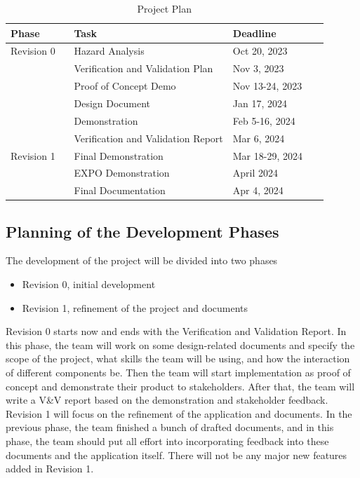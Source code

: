 \documentclass[12pt]{article}
\begin{document}
\begin{table}[H]
    \centering
    \begin{tabular}{|p{0.2\linewidth} | p{0.5\linewidth}| p{0.3\linewidth} |}
    \hline
    \textbf{Phase} & \textbf{Task} & \textbf{Deadline}\\
    \hline
    Revision 0 & Hazard Analysis & Oct 20, 2023 \\
     \cline{2-3} & Verification and Validation Plan & Nov 3, 2023 \\
     \cline{2-3} & Proof of Concept Demo & Nov 13-24, 2023\\
     \cline{2-3} & Design Document & Jan 17, 2024\\
     \cline{2-3} & Demonstration & Feb 5-16, 2024\\
     \cline{2-3} & Verification and Validation Report & Mar 6, 2024\\
     \hline
     Revision 1 & Final Demonstration & Mar 18-29, 2024\\
     \cline{2-3} & EXPO Demonstration & April 2024\\
     \cline{2-3} & Final Documentation & Apr 4, 2024\\
     
     
     
     
     
    \hline
    \end{tabular}
    \caption{Project Plan}
    \label{TblProjectTasks}
\end{table}

\subsection{Planning of the Development Phases}
The development of the project will be divided into two phases
\begin{itemize}
    \item Revision 0, initial development
    \item Revision 1, refinement of the project and documents
\end{itemize}
Revision 0 starts now and ends with the Verification and Validation Report. In this phase, the team will work on some design-related documents and specify the scope of the project, what skills the team will be using, and how the interaction of different components be. Then the team will start implementation as proof of concept and demonstrate their product to stakeholders. After that, the team will write a V\&V report based on the demonstration and stakeholder feedback.\\
Revision 1 will focus on the refinement of the application and documents. In the previous phase, the team finished a bunch of drafted documents, and in this phase, the team should put all effort into incorporating feedback into these documents and the application itself. There will not be any major new features added in Revision 1.
\end{document}
